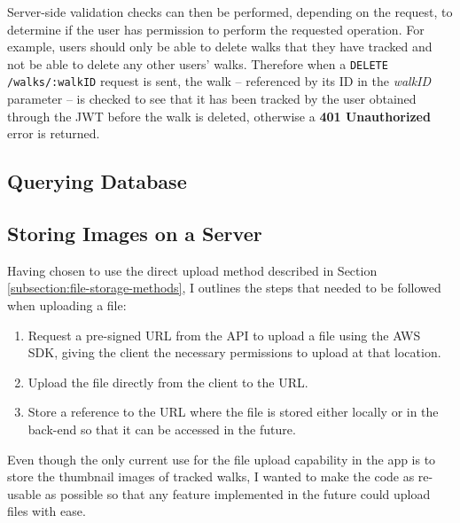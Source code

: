 Server-side validation checks can then be performed, depending on the request, to determine if the user has permission to perform the requested operation. For example, users should only be able to delete walks that they have tracked and not be able to delete any other users' walks. Therefore when a \verb|DELETE /walks/:walkID| request is sent, the walk -- referenced by its ID in the \textit{walkID} parameter -- is checked to see that it has been tracked by the user obtained through the JWT before the walk is deleted, otherwise a \textbf{401 Unauthorized} error is returned.

\subsection{Querying Database}


\subsection{Storing Images on a Server} \label{implementation:storing-images}

Having chosen to use the direct upload method described in Section \ref{subsection:file-storage-methods}, I outlines the steps that needed to be followed when uploading a file:

\begin{enumerate}[label=\textbf{Step \arabic*}]
  \item Request a pre-signed URL from the API to upload a file using the AWS SDK, giving the client the necessary permissions to upload at that location.
  \item Upload the file directly from the client to the URL.
  \item Store a reference to the URL where the file is stored either locally or in the back-end so that it can be accessed in the future.
\end{enumerate}

Even though the only current use for the file upload capability in the app is to store the thumbnail images of tracked walks, I wanted to make the code as re-usable as possible so that any feature implemented in the future could upload files with ease.

